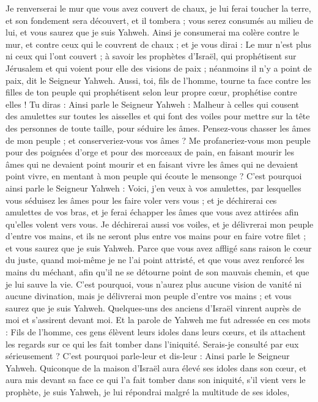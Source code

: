 \begin{multicols}{2}
Je renverserai le mur que vous avez couvert de chaux, je lui ferai toucher la terre, et son fondement sera découvert, et il tombera ; vous serez consumés au milieu de lui, et vous saurez que je suis Yahweh.
Ainsi je consumerai ma colère contre le mur, et contre ceux qui le couvrent de chaux ; et je vous dirai : Le mur n'est plus ni ceux qui l'ont couvert ;
à savoir les prophètes d'Israël, qui prophétisent sur Jérusalem et qui voient pour elle des visions de paix ; néanmoins il n'y a point de paix, dit le Seigneur Yahweh.
Aussi, toi, fils de l’homme, tourne ta face contre les filles de ton peuple qui prophétisent selon leur propre cœur, prophétise contre elles !
Tu diras : Ainsi parle le Seigneur Yahweh : Malheur à celles qui cousent des amulettes sur toutes les aisselles et qui font des voiles pour mettre sur la tête des personnes de toute taille, pour séduire les âmes. Pensez-vous chasser les âmes de mon peuple\FTNT{} ; et conserveriez-vous vos âmes ?
Me profaneriez-vous mon peuple pour des poignées d'orge et pour des morceaux de pain, en faisant mourir les âmes qui ne devaient point mourir et en faisant vivre les âmes qui ne devaient point vivre, en mentant à mon peuple qui écoute le mensonge ?
C'est pourquoi ainsi parle le Seigneur Yahweh : Voici, j'en veux à vos amulettes, par lesquelles vous séduisez les âmes pour les faire voler vers vous ; et je déchirerai ces amulettes de vos bras, et je ferai échapper les âmes que vous avez attirées afin qu'elles volent vers vous\FTNT{}.
Je déchirerai aussi vos voiles, et je délivrerai mon peuple d'entre vos mains, et ils ne seront plus entre vos mains pour en faire votre filet ; et vous saurez que je suis Yahweh.
Parce que vous avez affligé sans raison le cœur du juste, quand moi-même je ne l’ai point attristé, et que vous avez renforcé les mains du méchant, afin qu'il ne se détourne point de son mauvais chemin, et que je lui sauve la vie.
C'est pourquoi, vous n'aurez plus aucune vision de vanité ni aucune divination, mais je délivrerai mon peuple d'entre vos mains ; et vous saurez que je suis Yahweh.
\VerseOne{}Quelques-uns des anciens d'Israël vinrent auprès de moi et s'assirent devant moi.
Et la parole de Yahweh me fut adressée en ces mots :
Fils de l’homme, ces gens élèvent leurs idoles dans leurs cœurs, et ils attachent les regards sur ce qui les fait tomber dans l’iniquité. Serais-je consulté par eux sérieusement ?
C'est pourquoi parle-leur et dis-leur : Ainsi parle le Seigneur Yahweh. Quiconque de la maison d'Israël aura élevé ses idoles dans son cœur, et aura mis devant sa face ce qui l’a fait tomber dans son iniquité, s’il  vient vers le prophète, je suis Yahweh, je lui répondrai malgré la multitude de ses idoles,

\end{multicols}

